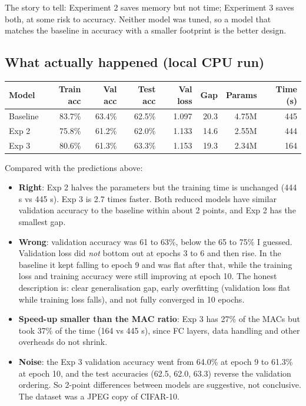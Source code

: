 \documentclass[11pt]{article}
\newcommand{\key}[1]{\textbf{#1}}
\begin{document}
The story to tell: Experiment 2 saves memory but not time; Experiment 3 saves both, at some risk to accuracy. Neither model was tuned, so a model that matches the baseline in accuracy with a smaller footprint is the better design.

\subsection{What actually happened (local CPU run)}

\begin{center}
\small
\begin{tabular}{lrrrrrrr}
\toprule
Model & Train acc & Val acc & Test acc & Val loss & Gap & Params & Time (s) \\
\midrule
Baseline & 83.7\% & 63.4\% & 62.5\% & 1.097 & 20.3 & 4.75M & 445 \\
Exp 2 & 75.8\% & 61.2\% & 62.0\% & 1.133 & 14.6 & 2.55M & 444 \\
Exp 3 & 80.6\% & 61.3\% & 63.3\% & 1.153 & 19.3 & 2.34M & 164 \\
\bottomrule
\end{tabular}
\end{center}

Compared with the predictions above:
\begin{itemize}[noitemsep]
\item \key{Right}: Exp 2 halves the parameters but the training time is unchanged (444 s vs 445 s). Exp 3 is 2.7 times faster. Both reduced models have similar validation accuracy to the baseline within about 2 points, and Exp 2 has the smallest gap.
\item \key{Wrong}: validation accuracy was 61 to 63\%, below the 65 to 75\% I guessed. Validation loss did \emph{not} bottom out at epochs 3 to 6 and then rise. In the baseline it kept falling to epoch 9 and was flat after that, while the training loss and training accuracy were still improving at epoch 10. The honest description is: clear generalisation gap, early overfitting (validation loss flat while training loss falls), and not fully converged in 10 epochs.
\item \key{Speed-up smaller than the MAC ratio}: Exp 3 has 27\% of the MACs but took 37\% of the time (164 vs 445 s), since FC layers, data handling and other overheads do not shrink.
\item \key{Noise}: the Exp 3 validation accuracy went from 64.0\% at epoch 9 to 61.3\% at epoch 10, and the test accuracies (62.5, 62.0, 63.3) reverse the validation ordering. So 2-point differences between models are suggestive, not conclusive. The dataset was a JPEG copy of CIFAR-10.
\end{itemize}
\end{document}
